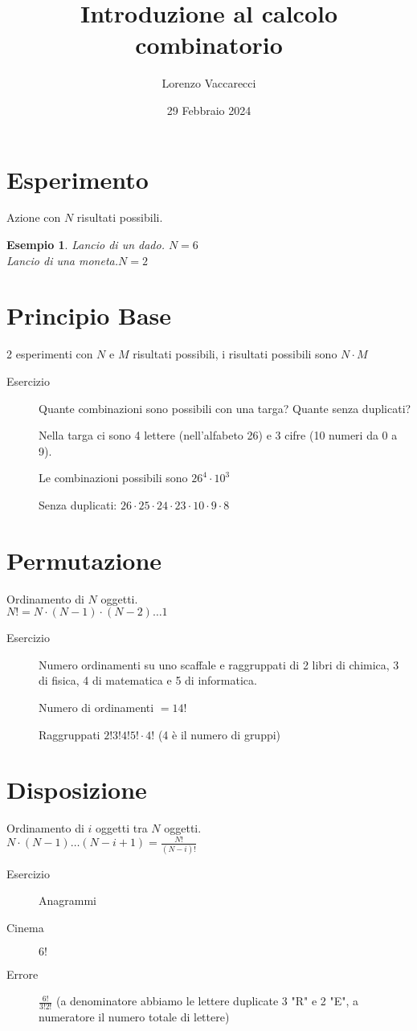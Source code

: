 \documentclass[12pt]{article}
\title{Introduzione al calcolo combinatorio}
\author{Lorenzo Vaccarecci}
\date{29 Febbraio 2024}
\newtheorem{example}{Esempio}
\begin{document}
\maketitle
\section{Esperimento}
Azione con \(N\) risultati possibili.\\
\begin{example}
Lancio di un dado. \(N=6\)\\
Lancio di una moneta.\(N=2\)\\
\end{example}
\section{Principio Base}
2 esperimenti con \(N\) e \(M\) risultati possibili, i risultati possibili sono \(N\cdot M\)
\begin{description}
    \item[Esercizio] Quante combinazioni sono possibili con una targa? Quante senza duplicati?
    \item[] Nella targa ci sono 4 lettere (nell'alfabeto 26) e 3 cifre (10 numeri da 0 a 9).
    \item[] Le combinazioni possibili sono \(26^4\cdot 10^3\)
    \item[] Senza duplicati: \(26\cdot 25\cdot 24\cdot 23\cdot 10\cdot 9\cdot 8\)
\end{description}
\section{Permutazione}
Ordinamento di \(N\) oggetti.\\
\(N!=N\cdot(N-1)\cdot(N-2)\dots1\)
\begin{description}
    \item[Esercizio] Numero ordinamenti su uno scaffale e raggruppati di 2 libri di chimica, 3 di fisica, 4 di matematica e 5 di informatica.
    \item[] Numero di ordinamenti \(=14!\)
    \item[] Raggruppati \(2!3!4!5! \cdot 4!\) (4 è il numero di gruppi)
\end{description}
\section{Disposizione}
Ordinamento di \(i\) oggetti tra \(N\) oggetti.\\
\(N\cdot(N-1)\dots(N-i+1)=\frac{N!}{(N-i)!}\)
\begin{description}
    \item[Esercizio] Anagrammi
    \item[Cinema] \(6!\)
    \item[Errore] \(\frac{6!}{3!2!}\) (a denominatore abbiamo le lettere duplicate 3 "R" e 2 "E", a numeratore il numero totale di lettere)
\end{description}
\end{document}
